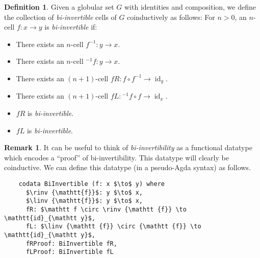 \documentclass{article}
\theoremstyle{definition}
\newtheorem{definition}{Definition}
\newtheorem{remark}{Remark}
\theoremstyle{examplestyle}
\DeclareMathOperator{\id}{id}
\newcommand{\linv}[1]{{}^{-1}\!#1}
\newcommand{\rinv}[1]{#1^{-1}}
\begin{document}
\begin{definition}
  Given a globular set \(G\) with identities and composition, we define the collection of \emph{bi-invertible} cells of \(G\) coinductively as follows: For \(n > 0\), an \(n\)-cell \(f: x \to y\) is \emph{bi-invertible} if:
  \begin{itemize}
  \item There exists an \(n\)-cell \(\rinv f: y \to x\).
  \item There exists an \(n\)-cell \(\linv f: y \to x\).
  \item There exists an \((n+1)\)-cell \(fR: f \circ \rinv f \to \id_y\).
  \item There exists an \((n+1)\)-cell \(fL: \linv f \circ f \to \id_x\).
  \item \(fR\) is \emph{bi-invertible}.
  \item \(fL\) is \emph{bi-invertible}.
  \end{itemize}
\end{definition}

\begin{remark}
  It can be useful to think of \emph{bi-invertibility} as a functional datatype which encodes a ``proof'' of bi-invertibility. This datatype will clearly be coinductive. We can define this datatype (in a pseudo-Agda syntax) as follows.

  \begin{lstlisting}
    codata BiInvertible (f: x $\to$ y) where
      $\rinv {\mathtt{f}}$: y $\to$ x,
      $\linv {\mathtt{f}}$: y $\to$ x,
      fR: $\mathtt f \circ \rinv {\mathtt {f}} \to \mathtt{id}_{\mathtt y}$,
      fL: $\linv {\mathtt {f}} \circ {\mathtt {f}} \to \mathtt{id}_{\mathtt y}$,
      fRProof: BiInvertible fR,
      fLProof: BiInvertible fL
  \end{lstlisting}
\end{remark}
\end{document}
